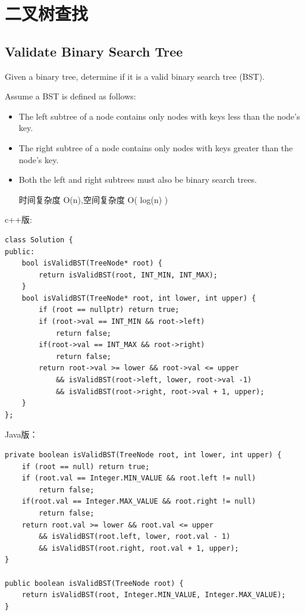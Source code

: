 \documentclass[12pt]{book}
\begin{document}
\section{二叉树查找}
\label{sec-4-4}

\subsection{Validate Binary Search Tree}
\label{sec-4-4-1}
Given a binary tree, determine if it is a valid binary search tree (BST).

Assume a BST is defined as follows:
\begin{itemize}
\item The left subtree of a node contains only nodes with keys less than the node's key.
\item The right subtree of a node contains only nodes with keys greater than the node's key.
\item Both the left and right subtrees must also be binary search trees.

时间复杂度 O(n),空间复杂度 O( log(n) )
\end{itemize}

c++版:
\lstset{language=java,label= ,caption= ,numbers=none}
\begin{lstlisting}
class Solution {
public:
    bool isValidBST(TreeNode* root) {
        return isValidBST(root, INT_MIN, INT_MAX);
    }
    bool isValidBST(TreeNode* root, int lower, int upper) {
        if (root == nullptr) return true;
        if (root->val == INT_MIN && root->left)
            return false;
        if(root->val == INT_MAX && root->right)
            return false;
        return root->val >= lower && root->val <= upper
            && isValidBST(root->left, lower, root->val -1)
            && isValidBST(root->right, root->val + 1, upper);
    }
};
\end{lstlisting}

Java版：
\lstset{language=java,label= ,caption= ,numbers=none}
\begin{lstlisting}
private boolean isValidBST(TreeNode root, int lower, int upper) {
    if (root == null) return true;
    if (root.val == Integer.MIN_VALUE && root.left != null)
        return false;
    if(root.val == Integer.MAX_VALUE && root.right != null)
        return false;
    return root.val >= lower && root.val <= upper
        && isValidBST(root.left, lower, root.val - 1)
        && isValidBST(root.right, root.val + 1, upper);
}

public boolean isValidBST(TreeNode root) {
    return isValidBST(root, Integer.MIN_VALUE, Integer.MAX_VALUE);
}
\end{lstlisting}
\end{document}
